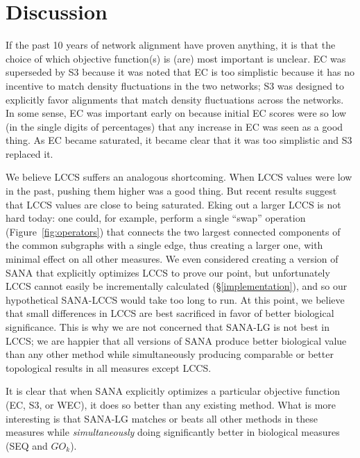 \documentclass{bioinfo}
\begin{document}
\section{Discussion}

If the past 10 years of network alignment have proven anything, it is that the choice of which objective function(s) is (are) most important is unclear. EC was superseded by S3 because it was noted that EC is too simplistic because it has no incentive to match density fluctuations in the two networks; S3 was designed to explicitly favor alignments that match density fluctuations across the networks.  In some sense, EC was important early on because initial EC scores were so low (in the single digits of percentages) that any increase in EC was seen as a good thing.  As EC became saturated, it became clear that it was too simplistic and S3 replaced it.

We believe LCCS suffers an analogous shortcoming.  When LCCS values were low in the past, pushing them higher was a good thing.  But recent results suggest that LCCS values are close to being saturated. Eking out a larger LCCS is not hard today: one could, for example, perform a single ``swap'' operation (Figure~\ref{fig:operators}) that connects the two largest connected components of the common subgraphs with a single edge, thus creating a larger one, with minimal effect on all other measures. We even considered creating a version of SANA that explicitly optimizes LCCS to prove our point, but unfortunately LCCS cannot easily be incrementally calculated (\S \ref{implementation}), and so our hypothetical SANA-LCCS would take too long to run.  At this point, we believe that small differences in LCCS are best sacrificed in favor of better biological significance.  This is why we are not concerned that SANA-LG is not best in LCCS; we are happier that all versions of SANA produce better biological value than any other method while simultaneously producing comparable or better topological results in all measures except LCCS.

It is clear that when SANA explicitly optimizes a particular objective function (EC, S3, or WEC), it does so better than any existing method. What is more interesting is that SANA-LG matches or beats all other methods in these measures while {\em simultaneously} doing significantly better in biological measures (SEQ and $GO_k$). %
\end{document}
